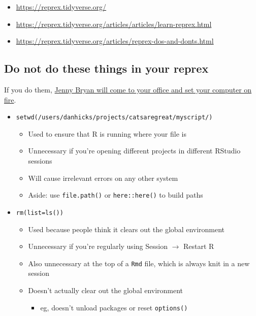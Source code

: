 \documentclass[
]{article}
\providecommand{\tightlist}{%
  \setlength{\itemsep}{0pt}\setlength{\parskip}{0pt}}
\begin{document}
\begin{itemize}
\tightlist
\item
  \url{https://reprex.tidyverse.org/}
\item
  \url{https://reprex.tidyverse.org/articles/articles/learn-reprex.html}
\item
  \url{https://reprex.tidyverse.org/articles/reprex-dos-and-donts.html}
\end{itemize}

\hypertarget{do-not-do-these-things-in-your-reprex}{%
\subsection{Do not do these things in your reprex}\label{do-not-do-these-things-in-your-reprex}}

If you do them, \href{https://www.tidyverse.org/blog/2017/12/workflow-vs-script/}{Jenny Bryan will come to your office and set your computer on fire}.

\begin{itemize}
\tightlist
\item
  \texttt{setwd(\textquotesingle{}/users/danhicks/projects/catsaregreat/myscript/\textquotesingle{})}

  \begin{itemize}
  \tightlist
  \item
    Used to ensure that R is running where your file is
  \item
    Unnecessary if you're opening different projects in different RStudio sessions
  \item
    Will cause irrelevant errors on any other system
  \item
    Aside: use \texttt{file.path()} or \texttt{here::here()} to build paths
  \end{itemize}
\item
  \texttt{rm(list=ls())}

  \begin{itemize}
  \tightlist
  \item
    Used because people think it clears out the global environment
  \item
    Unnecessary if you're regularly using Session \(\to\) Restart R
  \item
    Also unnecessary at the top of a \texttt{Rmd} file, which is always knit in a new session
  \item
    Doesn't actually clear out the global environment

    \begin{itemize}
    \tightlist
    \item
      eg, doesn't unload packages or reset \texttt{options()}
    \end{itemize}
  \end{itemize}
\end{itemize}
\end{document}
